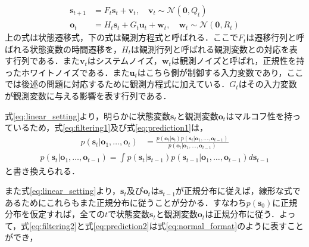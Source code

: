         \begin{equation}
            \label{eq:linear_setting}
            \begin{aligned}
                \bm{s}_{t+1} &= F_t \bm{s}_t + \bm{v}_t, \quad \bm{v}_t \sim \mathcal{N}(\bm{0}, Q_t)
                \\ \bm{o}_t &= H_t \bm{s}_t + G_t \bm{u}_t + \bm{w}_t, \quad \bm{w}_t \sim \mathcal{N}(\bm{0}, R_t)
            \end{aligned}        
        \end{equation}
        上の式は状態遷移式，下の式は観測方程式と呼ばれる．ここで$F_t$は遷移行列と呼ばれる状態変数の時間遷移を，$H_t$は観測行列と呼ばれる観測変数との対応を表す行列である．また$\bm{v}_t$はシステムノイズ，$\bm{w}_t$は観測ノイズと呼ばれ，正規性を持ったホワイトノイズである．また$\bm{u}_t$はこちら側が制御する入力変数であり，ここでは後述の問題に対応するために観測方程式に加えている．$G_t$はその入力変数が観測変数に与える影響を表す行列である．
        \par
        式\ref{eq:linear_setting}より，明らかに状態変数$\bm{s}_t$と観測変数$\bm{o}_t$はマルコフ性を持っているため，式\ref{eq:filtering1}及び式\ref{eq:prediction1}は，
        \begin{equation}
            \label{eq:filtering2}
            \begin{aligned}
                p(\left. \bm{s}_t \right| \bm{o}_1,\dots, \bm{o}_t ) &= \frac{p(\left. \bm{o}_t \right| \bm{s}_t) p(\left.\bm{s}_t\right| \bm{o}_1,\dots, \bm{o}_{t-1})}{p(\left.\bm{o}_t\right| \bm{o}_1,\dots, \bm{o}_{t-1})}
            \end{aligned}
        \end{equation}
        \begin{equation}
            \label{eq:prediction2}
            \begin{aligned}
                p(\left.\bm{s}_t\right| \bm{o}_1,\dots, \bm{o}_{t-1}) = \int p(\left.\bm{s}_t\right|\bm{s}_{t-1}) p(\left.\bm{s}_{t-1}\right| \bm{o}_1,\dots, \bm{o}_{t-1}) d\bm{s}_{t-1}
            \end{aligned}
        \end{equation}
        と書き換えられる．
        \par
        また式\ref{eq:linear_setting}より，$\bm{s}_t$及び$\bm{o}_t$は$\bm{s}_{t-1}$が正規分布に従えば，線形な式であるためにこれらもまた正規分布に従うことが分かる．すなわち$p(\bm{s}_0)$に正規分布を仮定すれば，全ての$t$で状態変数$\bm{s}_t$と観測変数$\bm{o}_t$は正規分布に従う．よって，式\ref{eq:filtering2}と式\ref{eq:prediction2}は式\ref{eq:normal_format}のように表すことができ，
